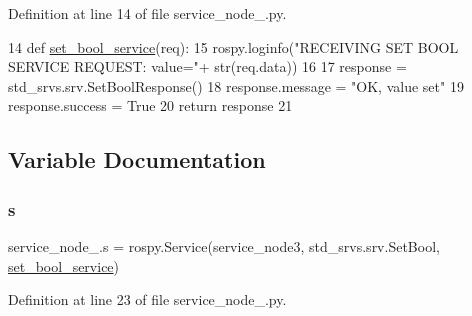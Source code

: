 Definition at line 14 of file service\+\_\+node\+\_.\+py.


\begin{DoxyCode}
14   \textcolor{keyword}{def }\hyperlink{namespaceservice__node__3_affc7430f48ff995e3010d20ea9921473}{set\_bool\_service}(req):
15       rospy.loginfo(\textcolor{stringliteral}{"RECEIVING SET BOOL SERVICE REQUEST: value="}+ str(req.data))
16 
17       response = std\_srvs.srv.SetBoolResponse()
18       response.message = \textcolor{stringliteral}{"OK, value set"}
19       response.success = \textcolor{keyword}{True}
20       \textcolor{keywordflow}{return} response
21 
\end{DoxyCode}


\subsection{Variable Documentation}
\mbox{\label{namespaceservice__node__3_aa976421a49e0b54f23833423400849ae}} 
\subsubsection{\texorpdfstring{s}{s}}
{\footnotesize\ttfamily service\+\_\+node\+\_.\+s = rospy.\+Service(\textquotesingle{}service\+\_\+node3\textquotesingle{}, std\+\_\+srvs.\+srv.\+Set\+Bool, \hyperlink{namespaceservice__node__3_affc7430f48ff995e3010d20ea9921473}{set\+\_\+bool\+\_\+service})}



Definition at line 23 of file service\+\_\+node\+\_.\+py.

